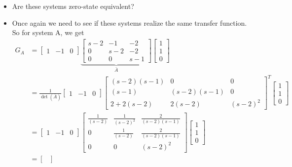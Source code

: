 \documentclass[10pt]{article}
\begin{document}
\begin{itemize}
\item  Are these systems zero-state equivalent?
\item[] 
Once again we need to see if these systems realize the same transfer
function.
So for system A, we get
\begin{equation}
  \begin{split}
    G_A &=
    \begin{bmatrix}
      1 & -1 & 0
    \end{bmatrix}\underbrace{
    \begin{bmatrix}
      s-2 & -1 & -2 \\ 0 & s-2 & -2 \\ 0 & 0 & s-1
    \end{bmatrix}}_{\bar{A}}
    \begin{bmatrix}
      1 \\ 1\\ 0
    \end{bmatrix}\\
    &= \frac{1}{\det(\bar{A})}
    \begin{bmatrix}
      1 & -1 & 0
    \end{bmatrix}
    \begin{bmatrix}
      (s-2)(s-1) & 0 & 0 \\ (s-1) & (s-2)(s-1) & 0 \\ 2+ 2(s-2) &
      2(s-2) & (s-2)^2
    \end{bmatrix}^T
    \begin{bmatrix}
      1 \\ 1 \\ 0
    \end{bmatrix}\\
    &= 
    \begin{bmatrix}
      1 & -1 & 0
    \end{bmatrix}
    \begin{bmatrix}
      \frac{1}{(s-2)} &  \frac{1}{(s-2)^2} &  \frac{2}{(s-2)(s-1)} \\
      0 & \frac{1}{(s-2)} & \frac{2}{(s-2)(s-1)} \\
      0 & 0& (s-2)^2
    \end{bmatrix}
    \begin{bmatrix}
      1 \\ 1 \\ 0
    \end{bmatrix}\\
    &= 
    \begin{bmatrix}

\end{bmatrix}
\end{split}
\end{equation}
\end{itemize}
\end{document}
